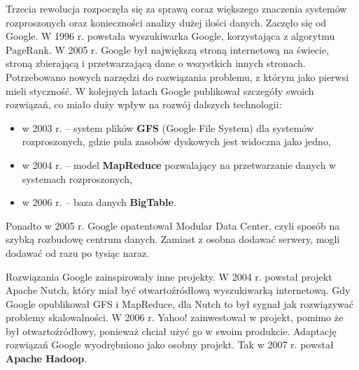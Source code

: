 \documentclass[12pt,a4paper,twoside,titlepage,openright]{book}
\begin{document}
Trzecia rewolucja rozpoczęła się za sprawą coraz większego znaczenia systemów rozproszonych oraz konieczności analizy dużej ilości danych. Zaczęło się od Google. W 1996 r. powstała wyszukiwarka Google, korzystająca z algorytmu PageRank. W 2005 r. Google był największą stroną internetową na świecie, stroną zbierającą i przetwarzającą dane o wszystkich innych stronach. Potrzebowano nowych narzędzi do rozwiązania problemu, z którym jako pierwsi mieli styczność. W kolejnych latach Google publikował szczegóły swoich rozwiązań, co miało duży wpływ na rozwój dalszych technologii:
\begin{itemize}
\item w 2003 r. -- system plików \textbf{GFS} (Google File System) dla systemów rozproszonych, gdzie pula zasobów dyskowych jest widoczna jako jedno,
\item w 2004 r. -- model \textbf{MapReduce} pozwalający na przetwarzanie danych w systemach rozproszonych,
\item w 2006 r. -- baza danych \textbf{BigTable}.
\end{itemize}
Ponadto w 2005 r. Google opatentował Modular Data Center, czyli sposób na szybką rozbudowę centrum danych. Zamiast z osobna dodawać serwery, mogli dodawać od razu po tysiąc naraz.

Rozwiązania Google zainspirowały inne projekty. W 2004 r. powstał projekt Apache Nutch, który miał być otwartoźródłową wyszukiwarką internetową. Gdy Google opublikował GFS i MapReduce, dla Nutch to był sygnał jak rozwiązywać problemy skalowalności. W 2006 r. Yahoo! zainwestował w projekt, pomimo że był otwartoźródłowy, ponieważ chciał użyć go w swoim produkcie. Adaptację rozwiązań Google wyodrębniono jako osobny projekt. Tak w 2007 r. powstał \textbf{Apache Hadoop}. \cite{hadoop}
\end{document}
